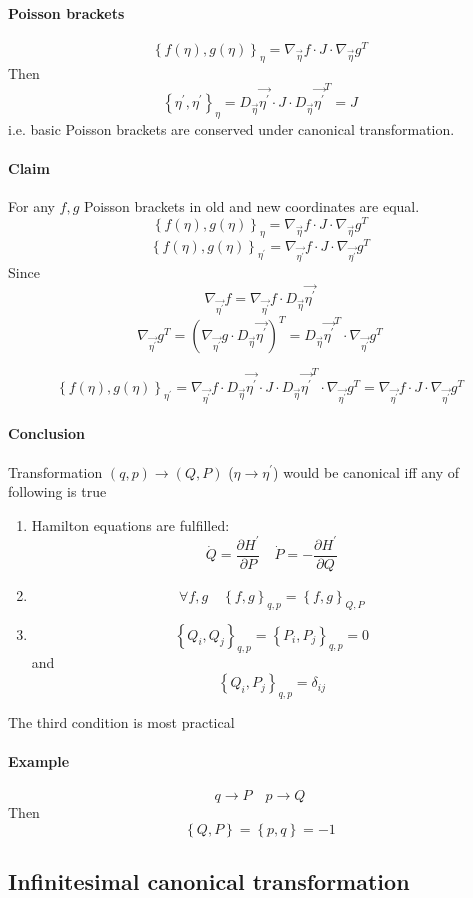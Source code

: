 \paragraph{Poisson brackets }
$$\left\{ f\left( \eta \right) , g\left( \eta \right) \right\}_\eta = \nabla_{\vec{\eta}} f \cdot J \cdot \nabla_{\vec{\eta}} g^T $$
Then
$$\left\{\eta^\prime, \eta^\prime  \right\}_\eta = D_{\vec{\eta}} \vec{\eta^\prime} \cdot J \cdot D_{\vec{\eta}} \vec{\eta^\prime}^T = J$$
i.e. basic Poisson brackets are conserved under canonical transformation. 
\paragraph{Claim} For any $f,g$ Poisson brackets in old and new coordinates are equal.
$$\left\{ f\left( \eta \right) , g\left( \eta \right) \right\}_\eta = \nabla_{\vec{\eta}} f \cdot J \cdot \nabla_{\vec{\eta}} g^T $$
$$\left\{ f\left( \eta \right) , g\left( \eta \right) \right\}_{\eta^\prime} = \nabla_{\vec{\eta^\prime}} f \cdot J \cdot \nabla_{\vec{\eta^\prime}} g^T $$
Since
$$\nabla_{\vec{\eta^\prime}} f = \nabla_{\vec{\eta^\prime}} f \cdot D_{\vec{\eta}} \vec{\eta^\prime}$$
$$\nabla_{\vec{\eta^\prime}} g^T = \left(\nabla_{\vec{\eta^\prime}} g \cdot D_{\vec{\eta}} \vec{\eta^\prime}\right)^T =  D_{\vec{\eta}} \vec{\eta^\prime}^T \cdot \nabla_{\vec{\eta^\prime}} g^T$$


$$\left\{ f\left( \eta \right) , g\left( \eta \right) \right\}_{\eta^\prime} = \nabla_{\vec{\eta^\prime}} f \cdot D_{\vec{\eta}} \vec{\eta^\prime} \cdot J \cdot D_{\vec{\eta}} \vec{\eta^\prime}^T \cdot \nabla_{\vec{\eta^\prime}} g^T = \nabla_{\vec{\eta^\prime}} f \cdot  J \cdot \nabla_{\vec{\eta^\prime}} g^T$$

\paragraph{Conclusion}
Transformation $(q,p) \to (Q,P)$ ($\eta \to \eta^\prime$) would be canonical iff any of following is true
\begin{enumerate}
	\item Hamilton equations are fulfilled: $$\dot{Q} = \frac{\partial H^\prime}{\partial P} \quad \dot{P} = -\frac{\partial H^\prime}{\partial Q}$$  
	\item $$\forall f,g \quad \left\{ f,g\right\}_{q,p} = \left\{ f,g\right\}_{Q,P}$$
	\item $$\left\{ Q_i, Q_j \right\}_{q,p}= \left\{ P_i, P_j\right\}_{q,p} = 0$$ and $$\left\{ Q_i, P_j \right\}_{q,p} = \delta_{ij}$$
\end{enumerate}
The third condition is most practical
\paragraph{Example}
$$q\to P \quad p \to Q$$
Then
$$\left\{ Q,P \right\} = \left\{ p,q \right\} = -1$$

\subsection{Infinitesimal canonical transformation }